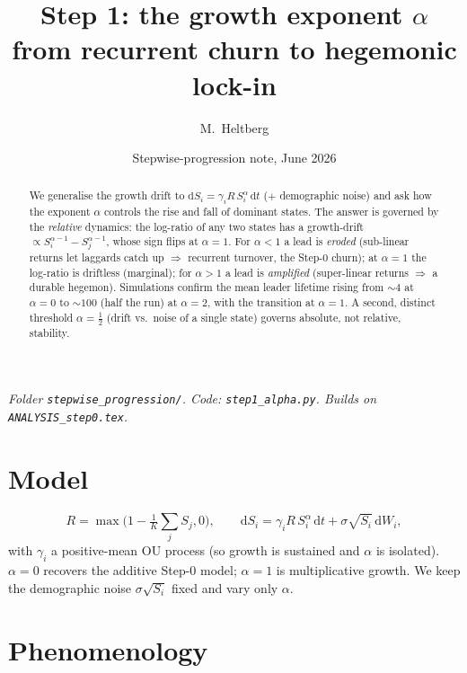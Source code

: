 \documentclass[11pt]{article}
\title{\textbf{Step 1: the growth exponent $\alpha$}\\[2pt]
\large from recurrent churn to hegemonic lock-in}
\author{M.\ Heltberg}
\date{Stepwise-progression note, June 2026}
\newcommand{\dd}{\mathrm{d}}
\begin{document}
\maketitle

\noindent\emph{Folder \texttt{stepwise\_progression/}. Code:
\texttt{step1\_alpha.py}. Builds on \texttt{ANALYSIS\_step0.tex}.}

\begin{abstract}
We generalise the growth drift to $\dd S_i=\gamma_i R\,S_i^{\alpha}\,\dd t$
($+$ demographic noise) and ask how the exponent $\alpha$ controls the rise and
fall of dominant states. The answer is governed by the \emph{relative} dynamics:
the log-ratio of any two states has a growth-drift $\propto
S_i^{\alpha-1}-S_j^{\alpha-1}$, whose sign flips at $\alpha=1$. For $\alpha<1$ a
lead is \emph{eroded} (sub-linear returns let laggards catch up $\Rightarrow$
recurrent turnover, the Step-0 churn); at $\alpha=1$ the log-ratio is driftless
(marginal); for $\alpha>1$ a lead is \emph{amplified} (super-linear returns
$\Rightarrow$ a durable hegemon). Simulations confirm the mean leader lifetime
rising from $\sim4$ at $\alpha=0$ to $\sim100$ (half the run) at $\alpha=2$, with
the transition at $\alpha=1$. A second, distinct threshold $\alpha=\tfrac12$
(drift vs.\ noise of a single state) governs absolute, not relative, stability.
\end{abstract}

\section{Model}

\begin{equation}
R=\max\!\Big(1-\tfrac1K\textstyle\sum_jS_j,0\Big),\qquad
\dd S_i=\gamma_i R\,S_i^{\alpha}\,\dd t+\sigma\sqrt{S_i}\,\dd W_i,
\label{eq:model}
\end{equation}
with $\gamma_i$ a positive-mean OU process (so growth is sustained and $\alpha$ is
isolated). $\alpha=0$ recovers the additive Step-0 model; $\alpha=1$ is
multiplicative growth. We keep the demographic noise $\sigma\sqrt{S_i}$ fixed and
vary only $\alpha$.

\section{Phenomenology}
\end{document}
